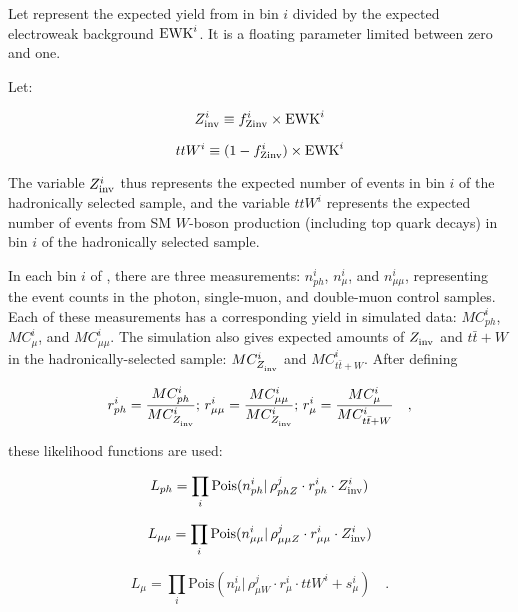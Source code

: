Let  represent the expected yield from \znunu in bin $i$
divided by the expected electroweak background $\ewk^{i}$.  It is
a floating parameter limited between zero and one.

Let:

\begin{equation}
  \zInv{i} \equiv \fZinv{i} \times \ewk^i 
  \label{eq:ZinvEwk}
\end{equation}

\begin{equation}
  ttW^{i} \equiv (1-\fZinv{i})\times \ewk^i
  \label{eq:ttWEwk}
\end{equation}

The variable $\zInv{i}$ thus represents the expected number of \znunu
events in \HT bin $i$ of the hadronically selected sample, and the
variable $ttW^i$ represents the expected number of events from SM
$W$-boson production (including top quark decays) in \HT bin $i$ of
the hadronically selected sample.

In each bin $i$ of \HT, there are three measurements: $n_{ph}^i$,
$n_{\mu}^i$, and $n_{\mu\mu}^i$, representing the event counts in the
photon, single-muon, and double-muon control samples.  Each of these
measurements has a corresponding yield in simulated data: $MC_{ph}^i$,
$MC_{\mu}^i$, and $MC_{\mu\mu}^i$.  The simulation also gives expected
amounts of $\zInv{}$ and $t\bar{t}+W$ in the hadronically-selected
sample: $MC_{\zInv{}}^i$ and $MC_{t\bar{t}+W}^i$.  After defining

\begin{equation}
r_{ph}^i = \frac{MC_{ph}^i}{MC_{\zInv{}}^i};\, r_{\mu\mu}^i =
\frac{MC_{\mu\mu}^i}{MC_{\zInv{}}^i};\, r_{\mu}^i =
\frac{MC_{\mu}^i}{MC_{t\bar{t}+W}^i}\quad ,
\end{equation}

these likelihood functions are used:

\begin{equation}
\label{eq:photonLikelihood}
L_{ph}= \prod_i \mathrm{Pois}(n_{ph}^i |\, \rho_{phZ}^j \cdot
r_{ph}^{i} \cdot \zInv{i})
\end{equation}

\begin{equation}
\label{eq:mumuLikelihood}
L_{\mu\mu}=\prod_i \mathrm{Pois}(n_{\mu\mu}^i |\, \rho_{\mu\mu Z}^j
\cdot r_{\mu\mu}^{i} \cdot \zInv{i})
\end{equation}

\begin{equation}
\label{eq:muonLikelihood}
L_{\mu}=\prod_i \mathrm{Pois}(n_{\mu}^i |\, \rho_{\mu W}^j \cdot
r_{\mu}^{i} \cdot ttW^{i} + s_{\mu}^i)\quad .
\end{equation}

